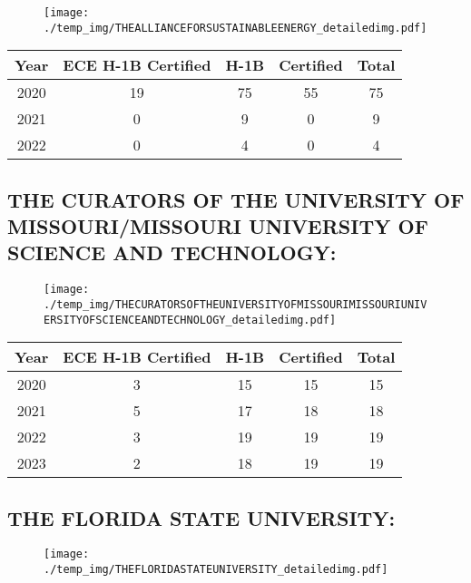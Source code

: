 \documentclass{article}%
\begin{document}
\begin{figure}[htbp]%
\centering%
\texttt{[image: ./temp\_img/THEALLIANCEFORSUSTAINABLEENERGY\_detailedimg.pdf]}%
\end{figure}

%
\begin{longtable}{c|c|c|c|c}%
\hline%
Year&ECE H{-}1B Certified&H{-}1B&Certified&Total\\%
\hline%
2020&19&75&55&75\\%
\hline%
2021&0&9&0&9\\%
\hline%
2022&0&4&0&4\\%
\hline%
\end{longtable}

%
\newpage%
\subsection{THE CURATORS OF THE UNIVERSITY OF MISSOURI/MISSOURI UNIVERSITY OF SCIENCE AND TECHNOLOGY:}%
\label{subsec:THECURATORSOFTHEUNIVERSITYOFMISSOURI/MISSOURIUNIVERSITYOFSCIENCEANDTECHNOLOGY}%
\label{THECURATORSOFTHEUNIVERSITYOFMISSOURIMISSOURIUNIVERSITYOFSCIENCEANDTECHNOLOGYdetailed}%


\begin{figure}[htbp]%
\centering%
\texttt{[image: ./temp\_img/THECURATORSOFTHEUNIVERSITYOFMISSOURIMISSOURIUNIVERSITYOFSCIENCEANDTECHNOLOGY\_detailedimg.pdf]}%
\end{figure}

%
\begin{longtable}{c|c|c|c|c}%
\hline%
Year&ECE H{-}1B Certified&H{-}1B&Certified&Total\\%
\hline%
2020&3&15&15&15\\%
\hline%
2021&5&17&18&18\\%
\hline%
2022&3&19&19&19\\%
\hline%
2023&2&18&19&19\\%
\hline%
\end{longtable}

%
\newpage%
\subsection{THE FLORIDA STATE UNIVERSITY:}%
\label{subsec:THEFLORIDASTATEUNIVERSITY}%
\label{THEFLORIDASTATEUNIVERSITYdetailed}%


\begin{figure}[htbp]%
\centering%
\texttt{[image: ./temp\_img/THEFLORIDASTATEUNIVERSITY\_detailedimg.pdf]}%
\end{figure}
\end{document}
